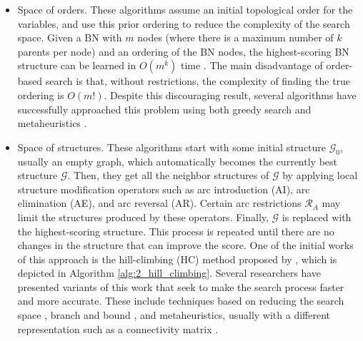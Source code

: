 \begin{itemize}
	\item Space of orders. These algorithms assume an initial topological order for the variables, and use this prior ordering to reduce the complexity of the search space. Given a BN with $m$ nodes (where there is a maximum number of $k$ parents per node) and an ordering of the BN nodes, the highest-scoring BN structure can be learned in $O(m^{k})$ time  \citep{cooper1992}. The main disadvantage of order-based search is that, without restrictions, the complexity of finding the true ordering is $O(m!)$. Despite this discouraging result, several algorithms have successfully approached this problem using both greedy search \citep{teyssier2005, scanagatta2017} and metaheuristics \citep{larranaga1996order, hsu2002, faulkner2007}.
	
	\item Space of structures. These algorithms start with some initial structure $\mathcal{G}_{0}$, usually an empty graph, which automatically becomes the currently best structure $\mathcal{G}$. Then, they get all the neighbor structures of $\mathcal{G}$ by applying local structure modification operators such as arc introduction (AI), arc elimination (AE), and arc reversal (AR). Certain arc restrictions $\mathcal{R}_{A}$ may limit the structures produced by these operators. Finally, $\mathcal{G}$ is replaced with the highest-scoring structure. This process is repeated until there are no changes in the structure that can improve the score. One of the initial works of this approach is the  hill-climbing (HC) method proposed by \cite{chickering1995search}, which is depicted in Algorithm \ref{alg:2_hill_climbing}. Several researchers have presented variants of this work that seek to make the search process faster and more accurate. These include techniques based on reducing the search space \citep{hwang2002}, branch and bound \citep{suzuki1999, suzuki2018}, and metaheuristics, usually with a different representation such as a connectivity matrix \citep{larranaga1996struct, wong1999, blanco2003, kim2013}.
\end{itemize}

